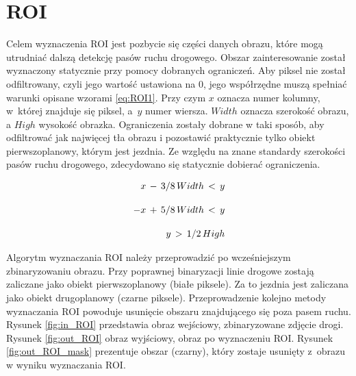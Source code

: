 \section{ROI}
Celem wyznaczenia ROI jest pozbycie się części danych obrazu, które mogą utrudniać dalszą detekcję pasów ruchu drogowego.
Obszar zainteresowanie został wyznaczony statycznie przy pomocy dobranych ograniczeń.
Aby piksel nie został odfiltrowany, czyli jego wartość ustawiona na 0, jego współrzędne muszą spełniać warunki opisane wzorami \eqref{eq:ROI1}. Przy czym $x$ oznacza numer kolumny, w~której znajduje się piksel, a~$y$ numer wiersza. $Width$ oznacza szerokość obrazu, a $High$ wysokość obrazka.
Ograniczenia zostały dobrane w taki sposób, aby odfiltrować jak najwięcej tła obrazu i pozostawić praktycznie tylko obiekt pierwszoplanowy, którym jest jezdnia.
Ze względu na znane standardy szerokości pasów ruchu drogowego, zdecydowano się statycznie dobierać ograniczenia.

\begin{equation}
{\displaystyle {\begin{aligned}\,x\,-\,3/8 \,Width\,<\,y\\[10pt]\,-x\,+\,5/8 \,Width\,<\,y\\[10pt]\,y\,>\,1/2 \,High\end{aligned}}}\\[10pt]
\label{eq:ROI1}
\end{equation}


Algorytm wyznaczania ROI należy przeprowadzić po wcześniejszym zbinaryzowaniu obrazu. 
Przy poprawnej binaryzacji linie drogowe zostają zaliczane jako obiekt pierwszoplanowy (białe piksele).
Za to jezdnia jest zaliczana jako obiekt drugoplanowy (czarne piksele).
Przeprowadzenie kolejno metody wyznaczania ROI powoduje usunięcie obszaru znajdującego się poza pasem ruchu.
Rysunek \ref{fig:in_ROI} przedstawia obraz wejściowy, zbinaryzowane zdjęcie drogi. Rysunek \ref{fig:out_ROI} obraz wyjściowy, obraz po wyznaczeniu ROI.
Rysunek \ref{fig:out_ROI_mask} prezentuje obszar (czarny), który zostaje usunięty z~obrazu w wyniku wyznaczania ROI.


